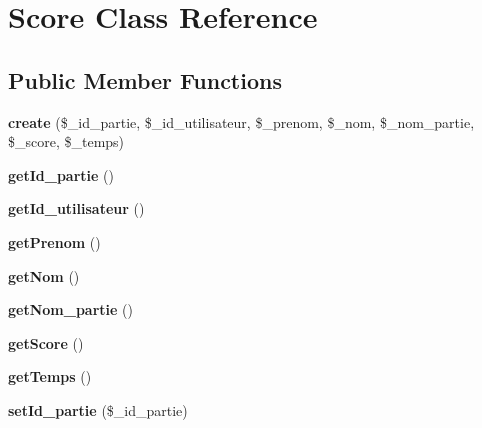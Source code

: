 \hypertarget{class_score}{}\section{Score Class Reference}
\label{class_score}
\subsection*{Public Member Functions}
\begin{DoxyCompactItemize}
\item 
\mbox{\label{class_score_a5f3b48e7792b8fdf10dd31dfb1f8cff1}} 
{\bfseries create} (\$\+\_\+id\+\_\+partie, \$\+\_\+id\+\_\+utilisateur, \$\+\_\+prenom, \$\+\_\+nom, \$\+\_\+nom\+\_\+partie, \$\+\_\+score, \$\+\_\+temps)
\item 
\mbox{\label{class_score_a3212f8c90b6adb064d0b70929dfeec4a}} 
{\bfseries get\+Id\+\_\+partie} ()
\item 
\mbox{\label{class_score_ad991e108a803a4ffb390c232cc32bcdc}} 
{\bfseries get\+Id\+\_\+utilisateur} ()
\item 
\mbox{\label{class_score_a2a243ff78ccebcd417fd644325f44701}} 
{\bfseries get\+Prenom} ()
\item 
\mbox{\label{class_score_a184f2299ee4553fa0782ea87c9aed362}} 
{\bfseries get\+Nom} ()
\item 
\mbox{\label{class_score_a953093d15d493a9958669ca3e9e8f239}} 
{\bfseries get\+Nom\+\_\+partie} ()
\item 
\mbox{\label{class_score_a19a6caf1c345ef59d5f8d7b9063c4c45}} 
{\bfseries get\+Score} ()
\item 
\mbox{\label{class_score_ac4ecd9b75ee6930df752471c57ed58aa}} 
{\bfseries get\+Temps} ()
\item 
\mbox{\label{class_score_a1c24bab5533c42a8a90d81053e39f92e}} 
{\bfseries set\+Id\+\_\+partie} (\$\+\_\+id\+\_\+partie)
\item 
\mbox{\label{class_score_a8fb52ad68b9f922838477e56349edf2d}} 

\end{DoxyCompactItemize}
